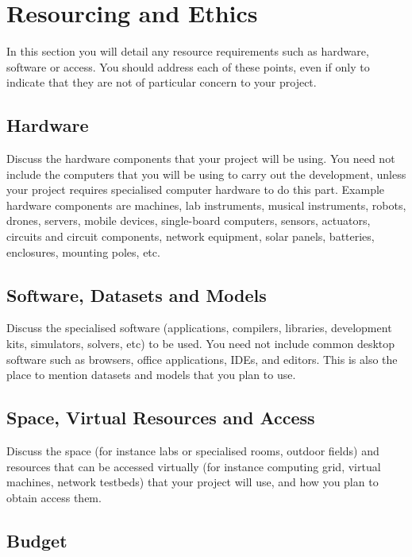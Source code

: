 \documentclass[11pt, a4paper, twoside, openright]{article}
\begin{document}
\section{Resourcing and Ethics}

In this section you will detail any resource requirements such as hardware, software or access. You should address each of these points, even if only to indicate that they are not of particular concern to your project.


\subsection{Hardware}

Discuss the hardware components that your project will be using. You need not include the computers that you will be using to carry out the development, unless your project requires specialised computer hardware to do this part. Example hardware components are machines, lab instruments, musical instruments, robots, drones, servers, mobile devices, single-board computers, sensors, actuators, circuits and circuit components, network equipment, solar panels, batteries, enclosures, mounting poles, etc.  

\subsection{Software, Datasets and Models}

Discuss the specialised software (applications, compilers, libraries, development kits, simulators, solvers, etc) to be used. You need not include common desktop software such as browsers, office applications, IDEs, and editors. This is also the place to mention datasets and models that you plan to use. 

\subsection{Space, Virtual Resources and Access}

Discuss the space (for instance labs or specialised rooms, outdoor fields) and resources that can be accessed virtually (for instance computing grid, virtual machines, network testbeds) that your project will use, and how you plan to obtain access them. 

\subsection{Budget}
\end{document}

